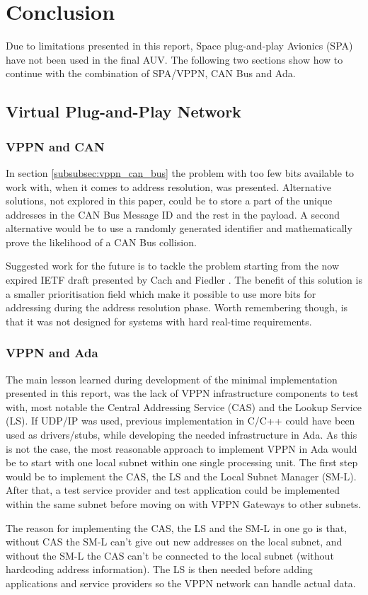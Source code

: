 \section{Conclusion}\label{sec:conclusion}
Due to limitations presented in this report, Space plug-and-play Avionics (SPA) have
not been used in the final AUV. The following two sections show how to continue
with the combination of SPA/VPPN, CAN Bus and Ada.

\subsection{Virtual Plug-and-Play Network}
\subsubsection{VPPN and CAN}
In section \ref{subsubsec:vppn_can_bus} the problem with too few bits
available to work with, when it comes to address resolution, was presented.
Alternative solutions, not explored in this paper, could be to store a part of the unique
addresses in the CAN Bus Message ID and the rest in the payload. A second
alternative would be to use a randomly generated identifier and mathematically
prove the likelihood of a CAN Bus collision.

Suggested work for the future is to tackle the problem starting from the now
expired IETF draft presented by Cach and Fiedler \cite{web:draft-ip_over_can}.
The benefit of this solution is a
smaller prioritisation field which make it possible to use more bits for
addressing during the address resolution phase. Worth remembering though, is
that it was not designed for systems with hard real-time requirements.

\subsubsection{VPPN and Ada}
The main lesson learned during development of the minimal implementation
presented in this report, was the lack of VPPN infrastructure
components to test with, most notable the Central Addressing Service (CAS) and the
Lookup Service (LS). If UDP/IP was used, previous implementation in C/C++ could have been
used as drivers/stubs, while developing the needed infrastructure in Ada. As
this is not the case, the most reasonable approach to implement VPPN in Ada would
be to start with one local subnet within one single processing unit. The first step
would be to implement the CAS, the LS and the Local Subnet Manager (SM-L).
After that, a test service provider and test application could be implemented
within the same subnet before moving on with VPPN Gateways to other subnets.

The reason for implementing the CAS, the LS and the SM-L in one go is
that, without CAS the SM-L can't give out new addresses on the local subnet, and
without the SM-L the CAS can't be connected to the local subnet (without
hardcoding address information). The LS is then needed before adding
applications and service providers so the VPPN network can handle actual data.
